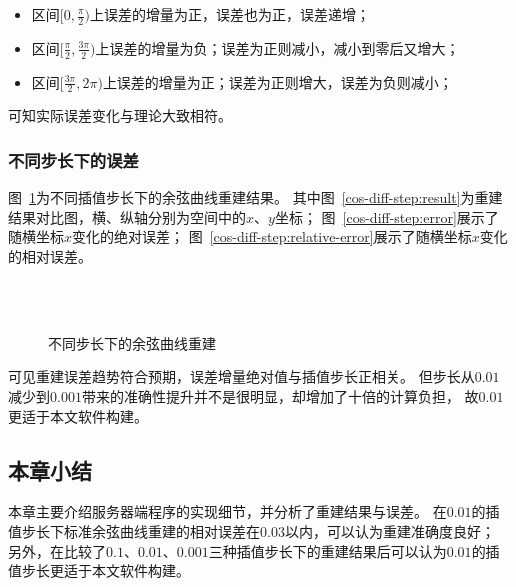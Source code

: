 \begin{itemize}
\item 区间$[0, \frac{\pi}{2})$上误差的增量为正，误差也为正，误差递增；
\item 区间$[\frac{\pi}{2}, \frac{3\pi}{2})$上误差的增量为负；误差为正则减小，减小到零后又增大；
\item 区间$[\frac{3\pi}{2}, 2\pi)$上误差的增量为正；误差为正则增大，误差为负则减小；
\end{itemize}

可知实际误差变化与理论大致相符。

\FloatBarrier

\subsubsection{不同步长下的误差}
\FloatBarrier

图~\ref{fig:cos-diff-step}为不同插值步长下的余弦曲线重建结果。
其中图~\ref{cos-diff-step:result}为重建结果对比图，横、纵轴分别为空间中的$x$、$y$坐标；
图~\ref{cos-diff-step:error}展示了随横坐标$x$变化的绝对误差；
图~\ref{cos-diff-step:relative-error}展示了随横坐标$x$变化的相对误差。

\begin{figure}
\centering
{}\\
\\
\caption{不同步长下的余弦曲线重建}
\label{fig:cos-diff-step}
\end{figure}

可见重建误差趋势符合预期，误差增量绝对值与插值步长正相关。
但步长从$0.01$减少到$0.001$带来的准确性提升并不是很明显，却增加了十倍的计算负担，
故$0.01$更适于本文软件构建。

\FloatBarrier

\subsection{本章小结}
本章主要介绍服务器端程序的实现细节，并分析了重建结果与误差。
在$0.01$的插值步长下标准余弦曲线重建的相对误差在$0.03$以内，可以认为重建准确度良好；
另外，在比较了$0.1$、$0.01$、$0.001$三种插值步长下的重建结果后可以认为$0.01$的插值步长更适于本文软件构建。

\clearpage


